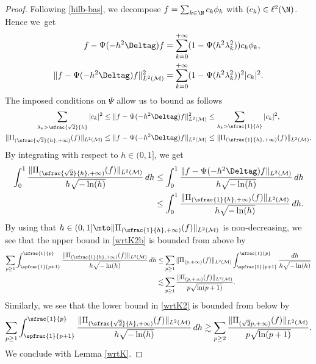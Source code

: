 \begin{proof}
Following \eqref{hilb-bas}, we decompose $f=\sum_{k\in \N} c_k \phi_k$ with $(c_k)\in \ell^{2}(\N)$. Hence we~get
\begin{align*}
f-\Psi(-h^2 \Deltag)f& = \sum_{k=0}^{+\infty} (1-\Psi(h^2 \lambda_k^2)) c_k\phi_k, \\
\|f-\Psi(-h^2 \Deltag)f\|_{L^2(\mathcal{M})}^2 &= \sum_{k=0}^{+\infty}
(1-\Psi(h^2 \lambda_k^2))^2 |c_k|^2.
\end{align*}
The imposed conditions on $\Psi$ allow us to bound as follows
\begin{align*}
\sum_{\lambda_k >\sfrac{\sqrt{2}}{h}} |c_k|^2& \leq \|f-\Psi(-h^2 \Deltag)f\|_{L^2(\mathcal{M})}^2 \leq \sum_{\lambda_k >\sfrac{1}{h}} |c_k|^2,\\
\|\Pi_{(\sfrac{\sqrt{2}}{h},+\infty)}(f)\|_{L^2(\mathcal{M})}& \leq \|f-\Psi(-h^2 \Deltag)f\|_{L^2(\mathcal{M})} \leq \|\Pi_{(\sfrac{1}{h},+\infty)}(f)\|_{L^2(\mathcal{M})}.
\end{align*}
By integrating with respect to $h\in (0,1]$, we get
\begin{align}\label{wrtK2}
\int_{0}^1 \frac{\|\Pi_{(\sfrac{\sqrt{2}}{h},+\infty)}(f)\|_{L^2(\mathcal{M})} }{h\sqrt{-\ln(h)}}\,dh & \leq 
\int_{0}^1 \frac{\|f-\Psi(-h^2 \Deltag)f\|_{L^2(\mathcal{M})} }{h\sqrt{-\ln(h)}}\,dh \\ \label{wrtK2b}
& \leq
\int_{0}^1 \frac{\|\Pi_{(\sfrac{1}{h},+\infty)}(f)\|_{L^2(\mathcal{M})} }{h\sqrt{-\ln(h)}}\,dh.
\end{align}
By using that $h\in (0,1]\mto \|\Pi_{(\sfrac{1}{h},+\infty)}(f)\|_{L^2(\mathcal{M})}$ is non-decreasing, we see that the upper bound in \eqref{wrtK2b} is bounded from above by
\begin{align*}
\sum_{p\geq 1} \int_{\spfrac{1}{p+1}}^{\sfrac{1}{p}}\frac{\|\Pi_{(\sfrac{1}{h},+\infty)}(f)\|_{L^2(\mathcal{M})} }{h\sqrt{-\ln(h)}}\,dh &\leq\sum_{p\geq 1} \|\Pi_{(p,+\infty)}(f)\|_{L^2(\mathcal{M})} \int_{\spfrac{1}{p+1}}^{\sfrac{1}{p}} \frac{dh}{h\sqrt{-\ln(h)}} \\
& \lesssim \sum_{p\geq 1} \frac{\|\Pi_{(p,+\infty)}(f)\|_{L^2(\mathcal{M})}}{p\sqrt{\ln(p+1)}}.
\end{align*}
Similarly, we see that the lower bound in \eqref{wrtK2} is bounded from below by
\[
\sum_{p\geq 1}\int_{\spfrac{1}{p+1}}^{\sfrac{1}{p}}\frac{\|\Pi_{(\sfrac{\sqrt{2}}{h},+\infty)}(f)\|_{L^2(\mathcal{M})} }{h\sqrt{-\ln(h)}}\,dh \gtrsim \sum_{p\geq 2} \frac{\|\Pi_{(\sqrt{2}p,+\infty)}(f)\|_{L^2(\mathcal{M})} }{p\sqrt{\ln(p+1)}}.
\]
We conclude with Lemma \ref{wrtK}.
\end{proof}

